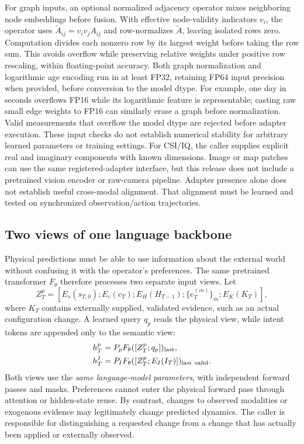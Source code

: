 For graph inputs, an optional normalized adjacency operator mixes neighboring
node embeddings before fusion. With effective node-validity indicators $v_i$,
the operator uses $\widetilde A_{ij}=v_i v_j A_{ij}$ and row-normalizes
$\widetilde A$, leaving isolated rows zero. Computation divides each nonzero row
by its largest weight before taking the row sum. This avoids overflow while
preserving relative weights under positive row rescaling, within floating-point
accuracy. Both graph normalization and logarithmic age encoding run in at least
FP32, retaining FP64 input precision when provided, before conversion to the
model dtype. For example, one day in seconds overflows FP16 while its logarithmic
feature is representable; casting raw small edge weights to FP16 can similarly
erase a graph before normalization. Valid measurements that overflow the model
dtype are rejected before adapter execution. These input checks do not establish
numerical stability for arbitrary learned parameters or training settings.
For CSI/IQ, the caller supplies explicit real
and imaginary components with known dimensions. Image or map patches can use
the same registered-adapter interface, but this release does not include a
pretrained vision encoder or raw-camera pipeline. Adapter presence alone does
not establish useful cross-modal alignment. That alignment must be learned and
tested on synchronized observation/action trajectories.

\subsection{Two views of one language backbone}
Physical predictions must be able to use information about the external world
without confusing it with the operator's preferences. The same pretrained
transformer $F_\theta$ therefore processes two separate input views. Let
\begin{equation}
 Z_T^p=[E_s(s_{T,0});E_c(c_T);E_H(H_{T-1});
                  \{e_T^{(m)}\}_m;E_K(K_T)],
\end{equation}
where $K_T$ contains externally supplied, validated evidence, such as an actual
configuration change. A learned query $q_p$ reads the physical view, while
intent tokens are appended only to the semantic view:
\begin{align}
 h_T^p&=P_pF_\theta([Z_T^p;q_p])_{\rm last},\\
 h_T^I&=P_IF_\theta([Z_T^p;E_I(I_T)])_{\rm last\ valid}.
\end{align}
Both views use the \emph{same language-model parameters}, with independent
forward passes and masks. Preferences cannot enter the physical forward pass
through attention or hidden-state reuse. By contrast, changes to observed
modalities or exogenous evidence may legitimately change predicted dynamics.
The caller is responsible for distinguishing a requested change from a change
that has actually been applied or externally observed.


